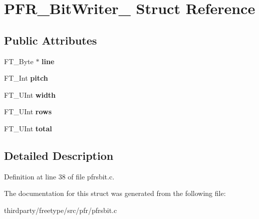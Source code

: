 \hypertarget{struct_p_f_r___bit_writer__}{}\section{P\+F\+R\+\_\+\+Bit\+Writer\+\_\+ Struct Reference}
\label{struct_p_f_r___bit_writer__}
\subsection*{Public Attributes}
\begin{DoxyCompactItemize}
\item 
\mbox{\label{struct_p_f_r___bit_writer___aad865baec1501005109dcf6d9fcaf3f2}} 
F\+T\+\_\+\+Byte $\ast$ {\bfseries line}
\item 
\mbox{\label{struct_p_f_r___bit_writer___ae1f2d3c2154719970bd4e21787306ffa}} 
F\+T\+\_\+\+Int {\bfseries pitch}
\item 
\mbox{\label{struct_p_f_r___bit_writer___af3ad7d3fc610495123a4b8a4923d279b}} 
F\+T\+\_\+\+U\+Int {\bfseries width}
\item 
\mbox{\label{struct_p_f_r___bit_writer___ae5cabbdde057f7eb3249c1808af71647}} 
F\+T\+\_\+\+U\+Int {\bfseries rows}
\item 
\mbox{\label{struct_p_f_r___bit_writer___a0766dd3c6891bb1624339713cb71d2f9}} 
F\+T\+\_\+\+U\+Int {\bfseries total}
\end{DoxyCompactItemize}


\subsection{Detailed Description}


Definition at line 38 of file pfrsbit.\+c.



The documentation for this struct was generated from the following file\+:\begin{DoxyCompactItemize}
\item 
thirdparty/freetype/src/pfr/pfrsbit.\+c\end{DoxyCompactItemize}
